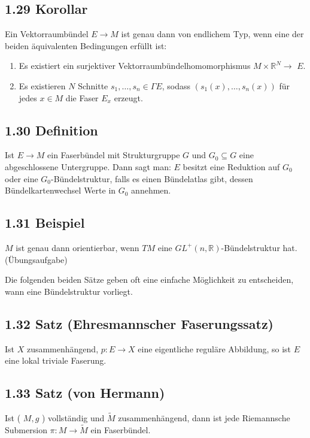 \subsection*{1.29 Korollar}
Ein Vektorraumbündel $E \rightarrow M$ ist genau dann von endlichem Typ, wenn eine der beiden äquivalenten Bedingungen erfüllt ist:

\begin{enumerate}
  \item Es existiert ein surjektiver Vektorraumbündelhomomorphismus $M \times \mathbb{R}^{N} \rightarrow$ $E$.
  \item Es existieren $N$ Schnitte $s_{1}, \ldots, s_{n} \in \Gamma E$, sodass $\left(s_{1}(x), \ldots, s_{n}(x)\right)$ für jedes $x \in M$ die Faser $E_{x}$ erzeugt.
\end{enumerate}

\subsection*{1.30 Definition}
Ist $E \rightarrow M$ ein Faserbündel mit Strukturgruppe $G$ und $G_{0} \subseteq G$ eine abgeschlossene Untergruppe. Dann sagt man: $E$ besitzt eine Reduktion auf $G_{0}$ oder eine $G_{0}$-Bündelstruktur, falls es einen Bündelatlas gibt, dessen Bündelkartenwechsel Werte in $G_{0}$ annehmen.

\subsection*{1.31 Beispiel}
$M$ ist genau dann orientierbar, wenn $T M$ eine $G L^{+}(n, \mathbb{R})$-Bündelstruktur hat. (Übungsaufgabe)

Die folgenden beiden Sätze geben oft eine einfache Möglichkeit zu entscheiden, wann eine Bündelstruktur vorliegt.

\subsection*{1.32 Satz (Ehresmannscher Faserungssatz)}
Ist $X$ zusammenhängend, $p: E \rightarrow X$ eine eigentliche reguläre Abbildung, so ist $E$ eine lokal triviale Faserung.

\subsection*{1.33 Satz (von Hermann)}
Ist ( $M, g$ ) vollständig und $\tilde{M}$ zusammenhängend, dann ist jede Riemannsche Submersion $\pi: M \rightarrow \tilde{M}$ ein Faserbündel.

